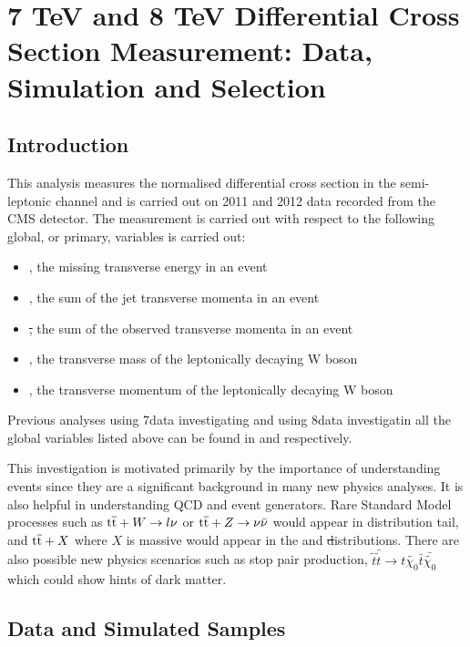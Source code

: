 \chapter{7 TeV and 8 TeV Differential Cross Section Measurement: Data, Simulation and Selection}
\label{c:Differential_Cross_Section:data_simulation_and_selection}

\section{Introduction}
\label{s:xsections_introduction}
This analysis measures the normalised differential \ttbar cross section in the semi-leptonic channel and is
carried out on 2011 and 2012 data recorded from the CMS detector. The measurement is carried out with respect
to the following global, or primary, variables is carried out:
\begin {itemize}
  \item {\met, the missing transverse energy in an event}
  \item {\HT, the sum of the jet transverse momenta in an event}
  \item {\st, the sum of the observed transverse momenta in an event}
  \item {\mt, the transverse mass of the leptonically decaying W boson}
  \item {\wpt, the transverse momentum of the leptonically decaying W boson}
\end{itemize}

Previous analyses using 7\TeV data investigating \met and using 8\TeV data investigatin all the
global variables listed above can be found in \cite{CMS-PAS-TOP-12-019} and \cite{CMS-PAS-TOP-12-042} respectively.

This investigation is motivated primarily by the importance of understanding \ttbar events since they are a
significant background in many new physics analyses. It is also helpful in understanding QCD and event
generators. Rare Standard Model processes such as $\mathrm{t}\overline{\mathrm{t}} + W\rightarrow l\nu$ or $\mathrm{t}\overline{\mathrm{t}} + Z\rightarrow
\nu\bar{\nu}$ would appear in \met distribution tail, and $\mathrm{t}\overline{\mathrm{t}} + X$ where $X$ is massive would appear in
the \HT and \st distributions. There are also possible new physics scenarios such as stop pair production,
$\tilde{t}\bar{\tilde{t}} \rightarrow t\tilde{\chi_0} \bar{t}\bar{\tilde{\chi_0}}$ which could show
hints of dark matter.

\section{Data and Simulated Samples}
\label{s:data_and_simulated_samples}

